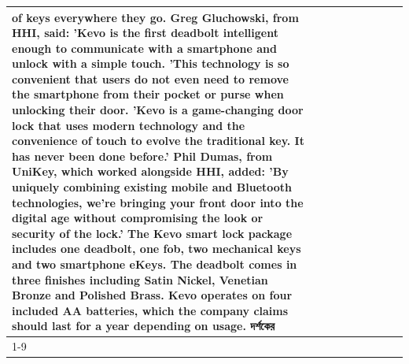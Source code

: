 \begin{table}[H]
\begin{tabular}{lllrlllll}
of keys everywhere they go. Greg Gluchowski, from HHI, said: 'Kevo is the first deadbolt intelligent enough to communicate with a smartphone and unlock with a simple touch. 'This technology is so convenient that users do not even need to remove the smartphone from their pocket or purse when unlocking their door. 'Kevo is a game-changing door lock that uses modern technology and the convenience of touch to evolve the traditional key. It has never been done before.' Phil Dumas, from UniKey, which worked alongside HHI, added: 'By uniquely combining existing mobile and Bluetooth technologies, we’re bringing your front door into the digital age without compromising the look or security of the lock.' The Kevo smart lock package includes one deadbolt, one fob, two mechanical keys and two smartphone eKeys. The deadbolt comes in three finishes including Satin Nickel, Venetian Bronze and Polished Brass. Kevo operates on four included AA batteries, which the company claims should last for a year depending on usage. দর্শকের \\
\cline{1-9}

\end{tabular}
\end{table}
